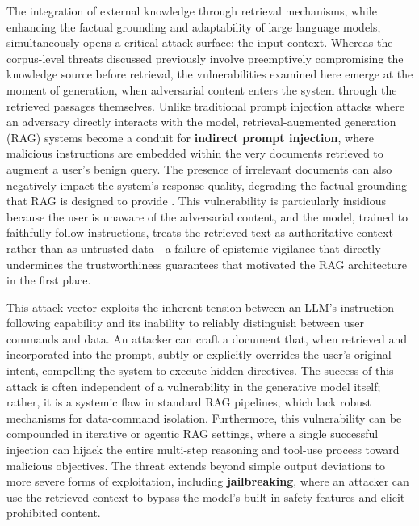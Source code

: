 \documentclass[11pt,a4paper]{article}
\begin{document}
The integration of external knowledge through retrieval mechanisms, while enhancing the factual grounding and adaptability of large language models, simultaneously opens a critical attack surface: the input context. Whereas the corpus-level threats discussed previously involve preemptively compromising the knowledge source before retrieval, the vulnerabilities examined here emerge at the moment of generation, when adversarial content enters the system through the retrieved passages themselves. Unlike traditional prompt injection attacks where an adversary directly interacts with the model, retrieval-augmented generation (RAG) systems become a conduit for \textbf{indirect prompt injection}, where malicious instructions are embedded within the very documents retrieved to augment a user's benign query. The presence of irrelevant documents can also negatively impact the system's response quality, degrading the factual grounding that RAG is designed to provide \cite{arxiv:2401.14887v3,arxiv:2405.20978v1,arxiv:2309.01431v2}. This vulnerability is particularly insidious because the user is unaware of the adversarial content, and the model, trained to faithfully follow instructions, treats the retrieved text as authoritative context rather than as untrusted data---a failure of epistemic vigilance that directly undermines the trustworthiness guarantees that motivated the RAG architecture in the first place.

This attack vector exploits the inherent tension between an LLM's instruction-following capability and its inability to reliably distinguish between user commands and data. An attacker can craft a document that, when retrieved and incorporated into the prompt, subtly or explicitly overrides the user's original intent, compelling the system to execute hidden directives. The success of this attack is often independent of a vulnerability in the generative model itself; rather, it is a systemic flaw in standard RAG pipelines, which lack robust mechanisms for data-command isolation. Furthermore, this vulnerability can be compounded in iterative or agentic RAG settings, where a single successful injection can hijack the entire multi-step reasoning and tool-use process toward malicious objectives. The threat extends beyond simple output deviations to more severe forms of exploitation, including \textbf{jailbreaking}, where an attacker can use the retrieved context to bypass the model's built-in safety features and elicit prohibited content.
\end{document}
